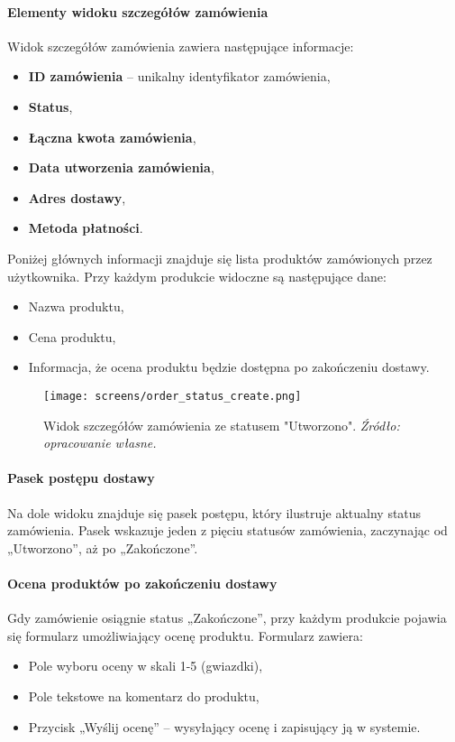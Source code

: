\documentclass[12pt,a4paper,oneside]{article}
\theoremstyle{definition}
\numberwithin{equation}{section}
\begin{document}
\paragraph{Elementy widoku szczegółów zamówienia}
Widok szczegółów zamówienia zawiera następujące informacje:
\begin{itemize}
    \item \textbf{ID zamówienia} – unikalny identyfikator zamówienia,
    \item \textbf{Status},
    \item \textbf{Łączna kwota zamówienia},
    \item \textbf{Data utworzenia zamówienia},
    \item \textbf{Adres dostawy},
    \item \textbf{Metoda płatności}.
\end{itemize}

Poniżej głównych informacji znajduje się lista produktów zamówionych przez użytkownika. Przy każdym produkcie widoczne są następujące dane:
\begin{itemize}
    \item Nazwa produktu,
    \item Cena produktu,
    \item Informacja, że ocena produktu będzie dostępna po zakończeniu dostawy.
\end{itemize}
\begin{figure}[H]
    \centering
    \texttt{[image: screens/order\_status\_create.png]}
    \caption{Widok szczegółów zamówienia ze statusem "Utworzono". \emph{Źródło: opracowanie własne.}}
    \label{fig:order_status_create}
\end{figure}
\paragraph{Pasek postępu dostawy}
Na dole widoku znajduje się pasek postępu, który ilustruje aktualny status zamówienia. Pasek wskazuje jeden z pięciu statusów zamówienia, zaczynając od „Utworzono”, aż po „Zakończone”.

\paragraph{Ocena produktów po zakończeniu dostawy}
Gdy zamówienie osiągnie status „Zakończone”, przy każdym produkcie pojawia się formularz umożliwiający ocenę produktu. Formularz zawiera:
\begin{itemize}
    \item Pole wyboru oceny w skali 1-5 (gwiazdki),
    \item Pole tekstowe na komentarz do produktu,
    \item Przycisk „Wyślij ocenę” – wysyłający ocenę i zapisujący ją w systemie.
\end{itemize}
\end{document}
